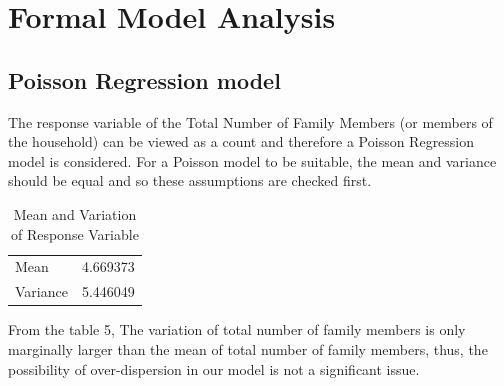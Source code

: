 \documentclass[
]{article}
\begin{document}
\newpage

\hypertarget{sec:FMA}{%
\section{Formal Model Analysis}\label{sec:FMA}}

\hypertarget{poisson-regression-model}{%
\subsection{Poisson Regression model}\label{poisson-regression-model}}

The response variable of the Total Number of Family Members (or members
of the household) can be viewed as a count and therefore a Poisson
Regression model is considered. For a Poisson model to be suitable, the
mean and variance should be equal and so these assumptions are checked
first.

\begin{table}

\caption{\label{tab:poisson mean and variance check}Mean and Variation of Response Variable}
\centering
\begin{tabular}[t]{l|r}
\hline
  & \\
\hline
Mean & 4.669373\\
\hline
Variance & 5.446049\\
\hline
\end{tabular}
\end{table}

From the table 5, The variation of total number of family members is
only marginally larger than the mean of total number of family members,
thus, the possibility of over-dispersion in our model is not a
significant issue.
\end{document}
